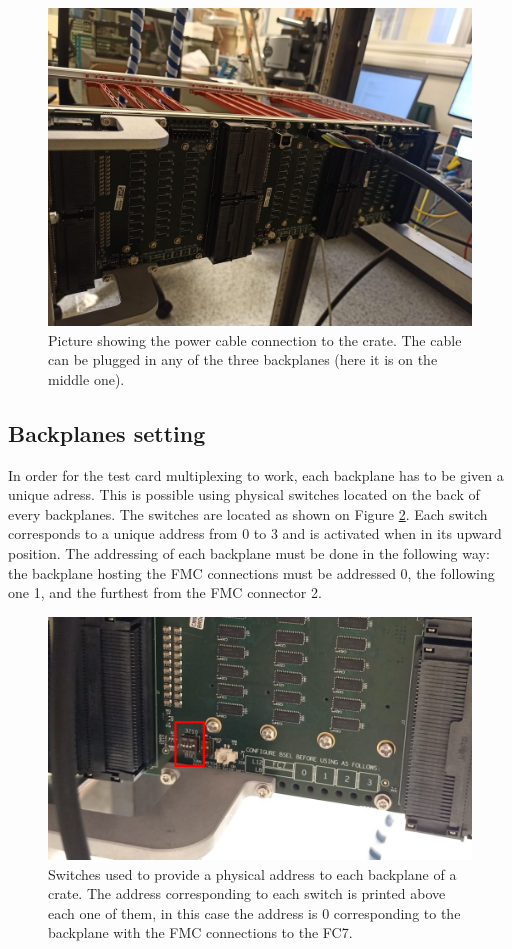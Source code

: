 \documentclass[10pt,a4paper]{article}
\begin{document}
\begin{figure}[h!]
\centering
 \includegraphics[width=0.7\linewidth]{PowerCable.jpeg} 
  \caption{Picture showing the power cable connection to the crate. The cable can be plugged in any of the three backplanes (here it is on the middle one).}
  \label{PhotoPowerConnectionCrate}
\end{figure}



\subsection{Backplanes setting}
In order for the test card multiplexing to work, each backplane has to be given a unique adress. This is possible using physical switches located on the back of every backplanes. The switches are located as shown on Figure \ref{BackPlaneSwitch}. Each switch corresponds to a unique address from 0 to 3 and is activated when in its upward position. The addressing of each backplane must be done in the following way: the backplane hosting the FMC connections must be addressed 0, the following one 1, and the furthest from the FMC connector 2.

\begin{figure}[h!]
 \includegraphics[width=\linewidth]{BackPlaneSwitch.jpeg} 
  \caption{Switches used to provide a physical address to each backplane of a crate. The address corresponding to each switch is printed above each one of them, in this case the address is 0 corresponding to the backplane with the FMC connections to the FC7.}
  \label{BackPlaneSwitch}
\end{figure}
\end{document}
